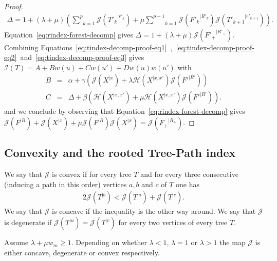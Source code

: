 \documentclass[11 pt]{modarticle}
\newcommand{\wmap}{w}
\newcommand{\wmin}{w_m}
\newcommand{\rtree}[2]{{#1}^{\lvert #2}}
\newcommand{\indexsymbol}{\mathcal{I}}
\newcommand{\tindex}[1]{\indexsymbol(#1)}
\newcommand{\rindexsymbol}{\mathcal{J}}
\newcommand{\rindex}[2]{\rindexsymbol(\rtree{#2}{#1})}
\newcommand{\aindexsymbol}{\mathcal{H}}
\newcommand{\aindex}[3]{\aindexsymbol(\rtree{#3}{#1, #2})}
\begin{document}
\begin{proof}
\begin{eqnarray*}
	\Delta = 1 + (\lambda + \mu) \left(\underset{k=1}{\overset{p}{\sum}} \rindex{r'_k}{T'_k} + \mu \underset{k=1}{\overset{p-1}{\sum}} \rindex{R'_k}{F'_k} \rindex{r'_{k+1}}{T'_{k+1}}\right).
\end{eqnarray*}
Equation~\eqref{eq:rindex-forest-decomp} gives $\Delta = 1 + (\lambda + \mu) \rindex{R'_+}{F'_+}$. Combining Equations~\eqref{eq:tindex-decomp-proof-eq1}~,~\eqref{eq:tindex-decomp-proof-eq2}~and~\eqref{eq:tindex-decomp-proof-eq3} gives $\tindex{T} = A + B \wmap(u) + C \wmap(u') + D \wmap(u) \wmap(u')$ with
\begin{eqnarray*}
	B & = & \alpha + \gamma\left(\rindex{x}{X} + \lambda \aindex{x}{x'}{X} \rindex{R'}{F'}\right) \\
	C & = &  \Delta + \beta\left(\aindex{x}{x'}{X} + \mu \aindex{x}{x'}{X} \rindex{R'}{F'}\right).
\end{eqnarray*}
and we conclude by observing that Equation~\eqref{eq:rindex-forest-decomp} gives $\rindex{R}{F} + \rindex{x}{X} + \mu \rindex{R}{F} \rindex{x}{X} = \rindex{R_+}{F_+}$.
\end{proof}


\subsection{Convexity and the rooted Tree-Path index}

\begin{defi}
We say that $\rindexsymbol$ is convex if for every tree $T$ and for every three consecutive (inducing a path in this order) vertices $a,b$ and $c$ of $T$ one has
\begin{eqnarray*}
	2 \rindex{b}{T} < \rindex{a}{T} + \rindex{c}{T}.
\end{eqnarray*}
We say that $\rindexsymbol$ is concave if the inequality is the other way around. We say that $\rindexsymbol$ is degenerate if $\rindex{u}{T} = \rindex{v}{T}$ for every two vertices of every tree $T$. 
\end{defi}

\begin{prop}\label{prop:convexity}
Assume $\lambda + \mu \wmin \geq 1$. Depending on whether $\lambda < 1$, $\lambda = 1$ or $\lambda > 1$ the map $\rindexsymbol$ is either concave, degenerate or convex respectively.
\end{prop}
\end{document}

